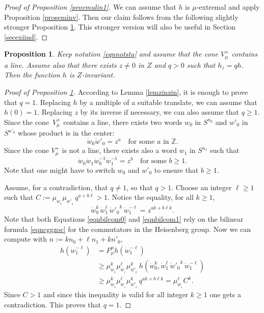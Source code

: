\documentclass[JEP,XML,SOM,Unicode]{cedram}
\newtheorem{Prop}[Thm]{Proposition}
\theoremstyle{definition}
\newcommand{\m}[1]{\mathbb{ #1}}
\begin{document}
\begin{proof}[Proof of Proposition \ref{provmulin1}]
We can assume that $h$ is $\mu$-extremal
and apply Proposition \ref{proseminv}.
Then our claim follows from the following slightly stronger
Proposition \ref{provmulin2}.
This stronger version will also be useful in Section \ref{secexiind}.
\end{proof}

\begin{Prop}

\label{provmulin2}
Keep notation \eqref{eqnnotsta} and assume that
the cone $V^+_\mu$ contains a line.
Assume also that there exists $z\neq 0$ in $Z$ and $q>0$ such that
$h_z=qh$. Then the function $h$ is $Z$-invariant.
\end{Prop}

\begin{proof}[Proof of Proposition \ref{provmulin2}]
According to Lemma \ref{lemzinzin}, it is enough to prove that $q=1$.
Replacing $h$ by a multiple of a suitable translate, we can assume that $h(0)= 1$.
Replacing $z$ by its inverse if necessary, we can also assume that $q\geq 1$.
Since the cone~$V_\mu^+$ contains a line,
there exists two words
$w_0$ in $S^{n_0}$ and $w'_0$ in $S^{n'_0}$
whose product is in the center:
\[
\dot{w}_0\dot{w}'_0= z^a
\quad\text{for some $a$ in $\m Z$.}
\]
Since the cone $V^+_\mu$ is not a line, there exists also a word $w_1$ in $S^{n_1}$ such that
\begin{equation}
\label{eqnbilcom0}
\dot{w}_0\dot{w}_1\dot{w}^{-1}_0\dot{w}_1^{-1}= z^b
\quad\text{for some $b\geq 1$.}
\end{equation}
Note that one might have to switch $w_0$ and $w'_0$
to ensure that $b\geq 1$.

Assume, for a contradiction, that $q\neq 1$, so that $q>1$. Choose an integer $\ell\geq 1$
such that $C:=\mu_{w_{_0}}\mu_{w'_{_0}}\,q^{a+b\ell}>1$. Notice the equality, for all $k\geq 1$,
\begin{equation}
\label{eqnbilcom1}
\dot{w}_0^k \,\dot{w}_1^\ell\, {\mbox{$\dot{w}$}'_0}^k\, \dot{w}_1^{-\ell} = z^{ak+b\ell k}.
\end{equation}
Note that both Equations \eqref{eqnbilcom0} and \eqref{eqnbilcom1} rely on
the bilinear formula \eqref{eqncggzoc}
for the commutators in the Heisenberg group.
Now we can compute with $n:=kn_0\!+\!\ell n_1\!+\! kn'_0$,
\begin{align*}
\label{eqnhwlcln}
h(\dot{w}_1^{-\ell})&=
P_\mu^{n}h(\dot{w}_1^{-\ell})\\
&\geq
\mu_{w_{_0}}^k \mu_{w_{_1}}^\ell \mu_{w'_{_0}}^k\,
h(\dot{w}_0^k, \dot{w}_1^\ell\, {\mbox{$\dot{w}$}'_0}^k\, \dot{w}_1^{-\ell})\\
&\geq
\mu_{w_{_0}}^k \mu_{w_{_1}}^\ell \mu_{w'_{_0}}^k\, q^{ak+b\ell k}
= \mu_{w_{_1}}^\ell C^k.
\end{align*}
Since $C>1$ and since this inequality is valid for all integer $k\geq 1$
one gets a contradiction. This proves that $q= 1$.
\end{proof}
\end{document}
